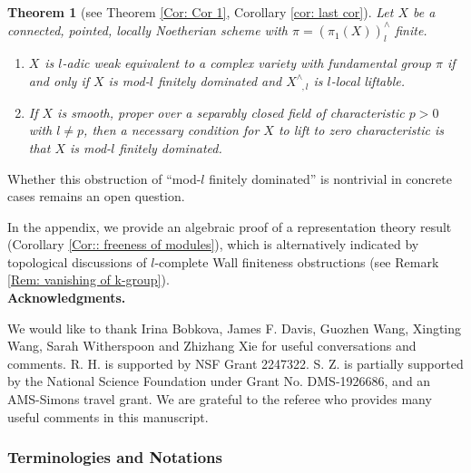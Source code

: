 \documentclass[11pt]{amsart}
\newtheorem{theorem}{Theorem}[section]
\theoremstyle{definition}
\numberwithin{equation}{section}
\numberwithin{equation}{section}
\DeclareMathOperator{\et}{\acute{e}t}
\begin{document}
\begin{theorem}[see Theorem \ref{Cor: Cor 1}, Corollary \ref{cor: last cor}] 
Let $X$ be a connected, pointed, locally Noetherian scheme with $\pi=(\pi^{\et}_1(X))^{\wedge}_l$ finite.
\begin{enumerate}
    \item $X_{\et}$ is $l$-adic weak equivalent to a complex variety with fundamental group $\pi$ if and only if $X$ is mod-$l$ finitely dominated and $X^{\wedge}_{\et,l}$ is $l$-local liftable.
    \item If $X$ is smooth, proper over a separably closed field of characteristic $p>0$ with $l\neq p$, then a necessary condition for $X$ to lift to zero characteristic is that $X$ is mod-$l$ finitely dominated.
\end{enumerate}
\end{theorem}

Whether this obstruction of ``mod-$l$ finitely dominated'' is nontrivial in concrete cases remains an open question.

In the appendix, we provide an algebraic proof of a representation theory result (Corollary \ref{Cor:: freeness of modules}), which is alternatively indicated by topological discussions of $l$-complete Wall finiteness obstructions (see Remark \ref{Rem: vanishing of k-group}).  \\

\noindent\textbf{Acknowledgments.} 

We would like to thank Irina Bobkova, James F. Davis, Guozhen Wang, Xingting Wang, Sarah Witherspoon and Zhizhang Xie for useful conversations and comments. 
 R. H. is supported by
NSF Grant 2247322.
S. Z. is partially supported by the National Science Foundation under Grant No. DMS-1926686, and an AMS-Simons travel grant.
We are grateful to the referee who provides many useful comments in this manuscript.

\subsubsection*{Terminologies and Notations}
\end{document}
